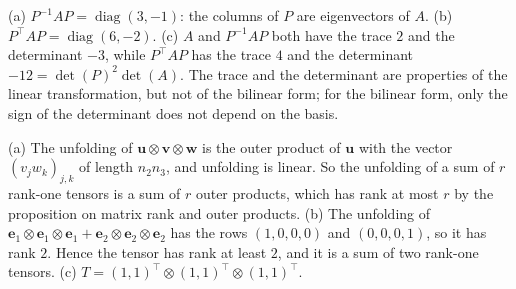 \documentclass[11pt]{article}
\DeclareMathOperator{\diag}{diag}
\begin{document}
\begin{description}[leftmargin=0pt, itemsep=0.3em]
    \item[\ref{pr:change-of-basis-practice}.] (a) $P^{-1}AP = \diag(3, -1)$: the columns of $P$ are eigenvectors of $A$. (b) $P^\top AP = \diag(6, -2)$. (c) $A$ and $P^{-1}AP$ both have the trace $2$ and the determinant $-3$, while $P^\top AP$ has the trace $4$ and the determinant $-12 = \det(P)^2\det(A)$. The trace and the determinant are properties of the linear transformation, but not of the bilinear form; for the bilinear form, only the sign of the determinant does not depend on the basis.
    \item[\ref{pr:unfolding-rank}.] (a) The unfolding of $\mathbf{u} \otimes \mathbf{v} \otimes \mathbf{w}$ is the outer product of $\mathbf{u}$ with the vector $(v_jw_k)_{j,k}$ of length $n_2n_3$, and unfolding is linear. So the unfolding of a sum of $r$ rank-one tensors is a sum of $r$ outer products, which has rank at most $r$ by the proposition on matrix rank and outer products. (b) The unfolding of $\mathbf{e}_1 \otimes \mathbf{e}_1 \otimes \mathbf{e}_1 + \mathbf{e}_2 \otimes \mathbf{e}_2 \otimes \mathbf{e}_2$ has the rows $(1, 0, 0, 0)$ and $(0, 0, 0, 1)$, so it has rank $2$. Hence the tensor has rank at least $2$, and it is a sum of two rank-one tensors. (c) $T = (1, 1)^\top \otimes (1, 1)^\top \otimes (1, 1)^\top$.
\end{description}
\end{document}
